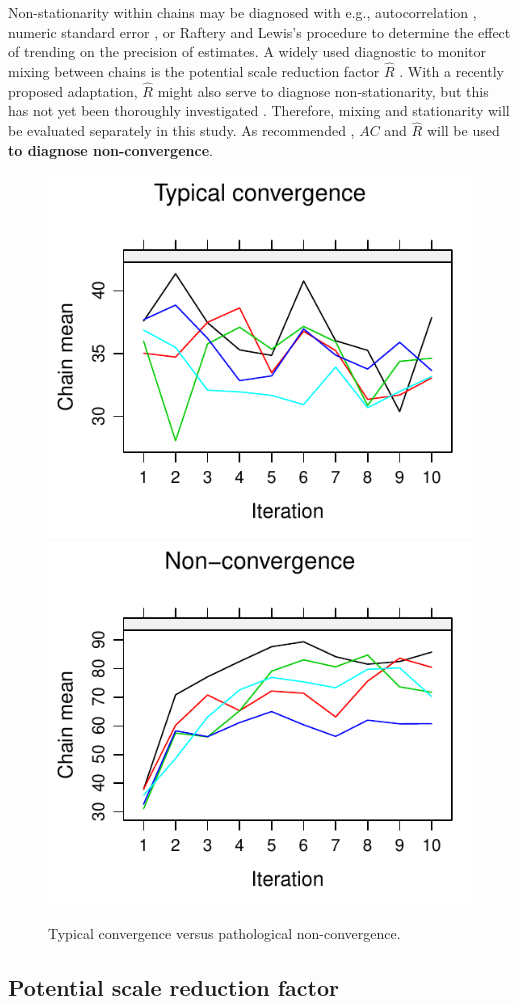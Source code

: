 \documentclass[Royal,times,sageh]{sagej}
\begin{document}
Non-stationarity within chains may be diagnosed with e.g.,
autocorrelation \citep[\(AC\);][]{scha97, gelm13}, numeric standard
error \citep[`MC error';][]{gewe92}, or Raftery and Lewis's
\citeyearpar{raft91} procedure to determine the effect of trending on
the precision of estimates. A widely used diagnostic to monitor mixing
between chains is the potential scale reduction factor \(\widehat{R}\)
\citep[`Gelman-Rubin statistic';][]{gelm92}. With a recently proposed
adaptation, \(\widehat{R}\) might also serve to diagnose
non-stationarity, but this has not yet been thoroughly investigated
\citep{veht19}. Therefore, mixing and stationarity will be evaluated
separately in this study. As recommended \citep[e.g.,][p.~898]{cowl96},
\(AC\) and \(\widehat{R}\) will be used \textbf{to diagnose
non-convergence}.

\begin{figure}

{\centering \includegraphics[width=.49\linewidth]{manuscript_files/figure-latex/non-conv-1} \includegraphics[width=.49\linewidth]{manuscript_files/figure-latex/non-conv-2} 

}

\caption{Typical convergence versus pathological non-convergence.}\label{fig:non-conv}
\end{figure}

\hypertarget{potential-scale-reduction-factor}{%
\subsection{Potential scale reduction
factor}\label{potential-scale-reduction-factor}}
\end{document}
